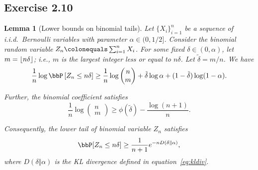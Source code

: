 \documentclass[11pt]{article}
\DeclarePairedDelimiter\floor{\lfloor}{\rfloor}
\newcommand{\off}[1]{\left[#1\right]}
\theoremstyle{plain}
\newtheorem{lem}{Lemma}
\theoremstyle{definition}
\begin{document}
\subsection{Exercise 2.10}\label{exe:210}
\begin{lem}[Lower bounds on binomial tails]
	Let $\{X_i\}_{i=1}^n$ be a sequence of i.i.d.\ Bernoulli variables with parameter $\alpha \in (0,1/2]$. Consider the binomial random variable $Z_n \colonequals \sum_{i=1}^n X_i$. For some fixed $\delta \in (0,\alpha)$, let $m = \floor{n\delta}$; i.e., $m$ is the largest integer less or equal to $n \delta$. Let $ \tilde \delta = {m}/{n}$. We have
	\begin{equation}\label{eq:e2101}
		\frac{1}{n} \log \bbP \off{Z_n \leq n\delta} \geq \frac{1}{n} \log \begin{pmatrix}
			n \\ m	\end{pmatrix} + \tilde \delta \log \alpha + (1 - \tilde \delta ) \log (1-\alpha).
	\end{equation}
	
	Further, the binomial coefficient satisfies
	\begin{equation}\label{eq:e2102}
		\frac{1}{n} \log \begin{pmatrix}
			n \\ m	\end{pmatrix} \geq \phi(\tilde \delta ) - \frac{\log (n+1)}{n}.
	\end{equation}
	
	Consequently, the lower tail of binomial variable $Z_n$ satisfies
	\begin{equation}\label{eq:e2103}
		\bbP[Z_n \leq n \delta]  \geq \frac{1}{n+1} e^{-nD(\delta \Vert \alpha)},
	\end{equation}
	where $D(\delta \Vert \alpha)$ is the KL divergence defined in equation~\eqref{eq:kldiv}.
\end{lem}
\end{document}
